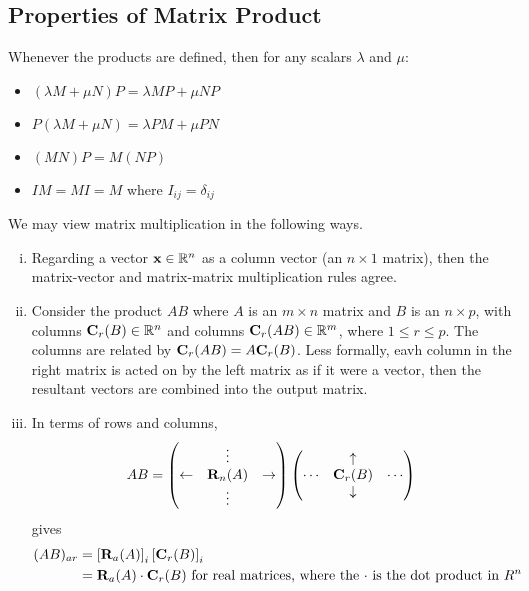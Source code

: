 \subsection{Properties of Matrix Product}
Whenever the products are defined, then for any scalars \(\lambda\) and \(\mu\):
\begin{itemize}
	\item \((\lambda M + \mu N)P = \lambda MP + \mu NP\)
	\item \(P(\lambda M + \mu N) = \lambda PM + \mu PN\)
	\item \((MN)P = M(NP)\)
	\item \(IM = MI = M\) where \(I_{ij} = \delta_{ij}\)
\end{itemize}
We may view matrix multiplication in the following ways.
\begin{enumerate}[(i)]
	\item Regarding a vector \(\vb x \in \mathbb R^n\) as a column vector (an \(n \times 1\) matrix), then the matrix-vector and matrix-matrix multiplication rules agree.
	\item Consider the product \(AB\) where \(A\) is an \(m \times n\) matrix and \(B\) is an \(n \times p\), with columns \(\vb C_r(B) \in \mathbb R^n\) and columns \(\vb C_r(AB) \in \mathbb R^m\), where \(1 \leq r \leq p\).
	      The columns are related by \(\vb C_r(AB) = A \vb C_r(B)\).
	      Less formally, eavh column in the right matrix is acted on by the left matrix as if it were a vector, then the resultant vectors are combined into the output matrix.
	\item In terms of rows and columns,
	      \[
		      AB = \begin{pmatrix}
			                 & \vdots     &             \\
			      \leftarrow & \vb R_n(A) & \rightarrow \\
			                 & \vdots     &
		      \end{pmatrix} \begin{pmatrix}
			             & \uparrow   &        \\
			      \cdots & \vb C_r(B) & \cdots \\
			             & \downarrow &
		      \end{pmatrix}
	      \]
	      gives
	      \begin{align*}
		      (AB)_{ar} & = \left[ \vb R_a(A) \right]_i \left[ \vb C_r(B) \right]_i                                                  \\
		                & = \vb R_a(A) \cdot \vb C_r(B) \text{ for real matrices, where the \(\cdot\) is the dot product in \(R^n\)}
	      \end{align*}
\end{enumerate}

